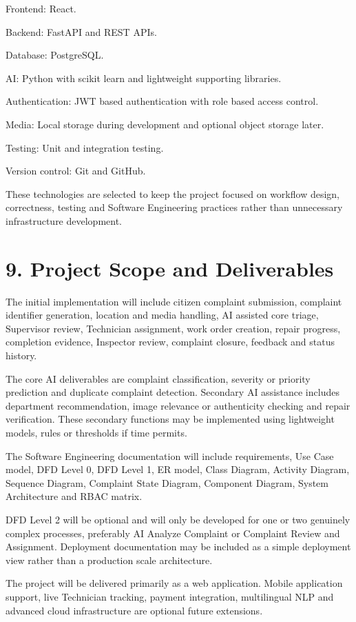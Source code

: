 \documentclass[12pt,a4paper]{article}
\begin{document}
Frontend: React.

Backend: FastAPI and REST APIs.

Database: PostgreSQL.

AI: Python with scikit learn and lightweight supporting libraries.

Authentication: JWT based authentication with role based access control.

Media: Local storage during development and optional object storage later.

Testing: Unit and integration testing.

Version control: Git and GitHub.

These technologies are selected to keep the project focused on workflow design, correctness, testing and Software Engineering practices rather than unnecessary infrastructure development.

\section{9. Project Scope and Deliverables}
The initial implementation will include citizen complaint submission, complaint identifier generation, location and media handling, AI assisted core triage, Supervisor review, Technician assignment, work order creation, repair progress, completion evidence, Inspector review, complaint closure, feedback and status history.

The core AI deliverables are complaint classification, severity or priority prediction and duplicate complaint detection. Secondary AI assistance includes department recommendation, image relevance or authenticity checking and repair verification. These secondary functions may be implemented using lightweight models, rules or thresholds if time permits.

The Software Engineering documentation will include requirements, Use Case model, DFD Level 0, DFD Level 1, ER model, Class Diagram, Activity Diagram, Sequence Diagram, Complaint State Diagram, Component Diagram, System Architecture and RBAC matrix.

DFD Level 2 will be optional and will only be developed for one or two genuinely complex processes, preferably AI Analyze Complaint or Complaint Review and Assignment. Deployment documentation may be included as a simple deployment view rather than a production scale architecture.

The project will be delivered primarily as a web application. Mobile application support, live Technician tracking, payment integration, multilingual NLP and advanced cloud infrastructure are optional future extensions.
\end{document}
